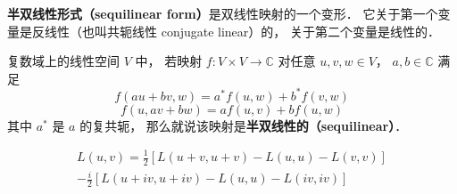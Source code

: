 
\begin{issues}
\issueDraft
\end{issues}

\textbf{半双线性形式（sequilinear form）}是双线性映射的一个变形． 它关于第一个变量是反线性（也叫共轭线性 conjugate linear）的， 关于第二个变量是线性的．
\begin{definition}{}
复数域上的线性空间 $V$ 中， 若映射 $f:V\times V\to \mathbb C$ 对任意 $u, v, w\in V$， $a,b\in \mathbb C$ 满足
\begin{equation}\label{sequil_eq2}
f(au+bv, w) = a^*f(u, w) + b^*f(v, w)
\end{equation}
\begin{equation}\label{sequil_eq1}
f(u, av+bw) = af(u, v) + bf(u, w)
\end{equation}
其中 $a^*$ 是 $a$ 的复共轭， 那么就说该映射是\textbf{半双线性的（sequilinear）}．
\end{definition}

\begin{equation}
\begin{aligned}
L(u, v) =\frac{1}{2}[L(u+v, u+v)-L(u, u)-L(v, v)]\\
-\frac{i}{2}[L(u+i v, u+i v)-L(u, u)-L(i v, i v)]
\end{aligned}
\end{equation}

